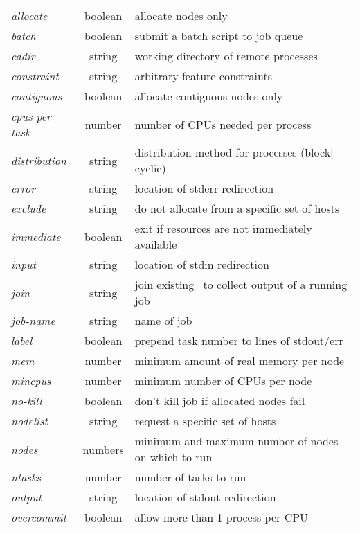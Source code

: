 \documentclass[10pt,onecolumn,times]{llncs}
\begin{document}
{\begin{table}[!tb]
\begin{center}
\begin{tabular}[t]{lcl}
      {\em allocate}	   & boolean& allocate nodes only		      \\
      {\em batch}	   & boolean& submit a batch script to job queue      \\
      {\em cddir}	   & string & working directory of remote processes   \\
      {\em constraint}     & string & arbitrary feature constraints	      \\
      {\em contiguous}	   & boolean& allocate contiguous nodes only	      \\
      {\em cpus-per-task } & number & number of CPUs needed per process      \\
      {\em distribution}   & string & distribution method for processes (block$|$cyclic) \\
      {\em error}	   & string & location of stderr redirection	      \\
      {\em exclude}	   & string & do not allocate from a specific set of hosts \\
      {\em immediate}	   & boolean& exit if resources are not immediately available  \\
      {\em input}	   & string & location of stdin redirection	      \\
      {\em join}	   & string & join existing \srun\ to collect output of a running job \\
      {\em job-name}	   & string & name of job 			      \\
      {\em label}	   & boolean& prepend task number to lines of stdout/err \\
      {\em mem}		   & number & minimum amount of real memory per node  \\
      {\em mincpus} 	   & number & minimum number of CPUs per node         \\
      {\em no-kill}	   & boolean& don't kill job if allocated nodes fail  \\
      {\em nodelist}	   & string & request a specific set of hosts	      \\
      {\em nodes}	   & numbers& minimum and maximum number of nodes on which to run \\
      {\em ntasks}         & number & number of tasks to run     	      \\
      {\em output}         & string & location of stdout redirection	      \\
      {\em overcommit}     & boolean& allow more than 1 process per CPU	      \\

\end{tabular}
\end{center}
\end{table}}
\end{document}
